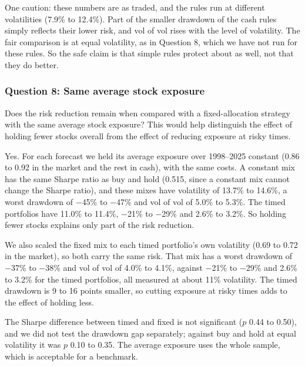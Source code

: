 One caution: these numbers are as traded, and the rules run at different volatilities (7.9\% to 12.4\%). Part of the smaller drawdown of the cash rules simply reflects their lower risk, and vol of vol rises with the level of volatility. The fair comparison is at equal volatility, as in Question 8, which we have not run for these rules. So the safe claim is that simple rules protect about as well, not that they do better.

\subsubsection*{Question 8: Same average stock exposure}
\begin{question}
Does the risk reduction remain when compared with a fixed-allocation strategy with the same average stock exposure? This would help distinguish the effect of holding fewer stocks overall from the effect of reducing exposure at risky times.
\end{question}
Yes. For each forecast we held its average exposure over 1998--2025 constant (0.86 to 0.92 in the market and the rest in cash), with the same costs. A constant mix has the same Sharpe ratio as buy and hold (0.515, since a constant mix cannot change the Sharpe ratio), and these mixes have volatility of 13.7\% to 14.6\%, a worst drawdown of $-$45\% to $-$47\% and vol of vol of 5.0\% to 5.3\%. The timed portfolios have 11.0\% to 11.4\%, $-$21\% to $-$29\% and 2.6\% to 3.2\%. So holding fewer stocks explains only part of the risk reduction.

We also scaled the fixed mix to each timed portfolio's own volatility (0.69 to 0.72 in the market), so both carry the same risk. That mix has a worst drawdown of $-$37\% to $-$38\% and vol of vol of 4.0\% to 4.1\%, against $-$21\% to $-$29\% and 2.6\% to 3.2\% for the timed portfolios, all measured at about 11\% volatility. The timed drawdown is 9 to 16 points smaller, so cutting exposure at risky times adds to the effect of holding less.

The Sharpe difference between timed and fixed is not significant ($p$ 0.44 to 0.50), and we did not test the drawdown gap separately; against buy and hold at equal volatility it was $p$ 0.10 to 0.35. The average exposure uses the whole sample, which is acceptable for a benchmark.

